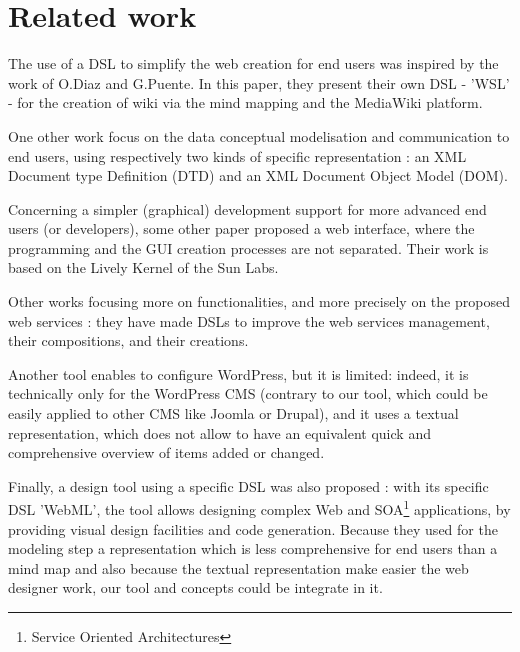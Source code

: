 \section{Related work}\label{relatedWorks}
The use of a DSL to simplify the web creation for end users was inspired by the
work of O.Diaz and G.Puente. In this paper, they present their own DSL - 'WSL' - for the creation of wiki via the mind mapping and the MediaWiki platform\cite{wikiScafolding}.

One other work\cite{conceptMod} focus on the data conceptual modelisation and communication to end users, using respectively two kinds of specific representation : an XML Document type Definition (DTD) and an XML Document Object Model (DOM).

Concerning a simpler (graphical) development support for more advanced end users (or developers), some other paper proposed a web interface, where the programming and the GUI creation processes are not separated\cite{livelyFabrik}. Their work is based on the Lively Kernel\cite{lively} of the Sun Labs.

Other works\cite{wsol,dslMashups} focusing more on functionalities, and more precisely on the proposed web services : they have made DSLs to improve the web services management, their compositions, and their creations.

Another tool \cite{dictator} enables to configure WordPress, but it is limited: indeed, it is technically only for the WordPress CMS (contrary to our tool, which could be easily applied to other CMS like Joomla or Drupal), and it uses a textual representation, which does not allow to have an equivalent quick and comprehensive overview of items added or changed.

Finally, a design tool using\cite{webRatio} a specific DSL was also proposed : with its specific DSL 'WebML', the tool allows designing complex Web and SOA\footnote{Service Oriented Architectures} applications, by providing visual design facilities and code generation. Because they used for the modeling step a representation which is less comprehensive for end users than a mind map and also because the textual representation make easier the web designer work, our tool and concepts could be integrate in it.